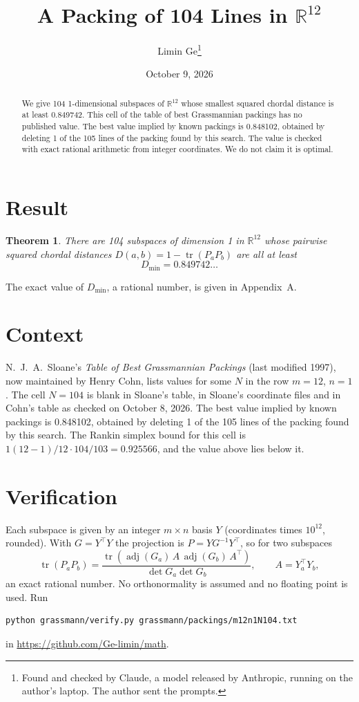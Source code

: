\documentclass[11pt,a4paper]{article}
\title{A Packing of 104 Lines in $\mathbb{R}^{12}$}
\author{Limin Ge\thanks{Found and checked by Claude, a model released by Anthropic, running on the author's laptop. The author sent the prompts.}}
\date{October 9, 2026}
\newtheorem*{theorem}{Theorem}
\begin{document}
\maketitle
\begin{abstract}
We give 104 1-dimensional subspaces of $\mathbb{R}^{12}$ whose smallest squared chordal distance is at least 0.849742. This cell of the table of best Grassmannian packings has no published value. The best value implied by known packings is 0.848102, obtained by deleting 1 of the 105 lines of the packing found by this search. The value is checked with exact rational arithmetic from integer coordinates. We do not claim it is optimal.
\end{abstract}

\section{Result}
\begin{theorem}
There are 104 subspaces of dimension 1 in $\mathbb{R}^{12}$ whose pairwise squared chordal distances $D(a,b) = 1 - \operatorname{tr}(P_aP_b)$ are all at least
\[ D_{\min} = 0.849742\ldots \]
\end{theorem}
The exact value of $D_{\min}$, a rational number, is given in Appendix~A.


\section{Context}
N.~J.~A.~Sloane's \emph{Table of Best Grassmannian Packings} (last modified 1997), now maintained by Henry Cohn, lists values for some $N$ in the row $m=12$, $n=1$. The cell $N=104$ is blank in Sloane's table, in Sloane's coordinate files and in Cohn's table as checked on October 8, 2026. The best value implied by known packings is 0.848102, obtained by deleting 1 of the 105 lines of the packing found by this search. The Rankin simplex bound for this cell is $1(12-1)/12\cdot 104/103 = 0.925566$, and the value above lies below it.


\section{Verification}
Each subspace is given by an integer $m\times n$ basis $Y$ (coordinates times $10^{12}$, rounded). With $G=Y^\top Y$ the projection is $P=YG^{-1}Y^\top$, so for two subspaces
\[ \operatorname{tr}(P_aP_b)=\frac{\operatorname{tr}(\operatorname{adj}(G_a)\,A\,\operatorname{adj}(G_b)\,A^\top)}{\det G_a\det G_b},\qquad A=Y_a^\top Y_b, \]
an exact rational number. No orthonormality is assumed and no floating point is used. Run
\begin{verbatim}
python grassmann/verify.py grassmann/packings/m12n1N104.txt
\end{verbatim}
in \url{https://github.com/Ge-limin/math}.
\end{document}
